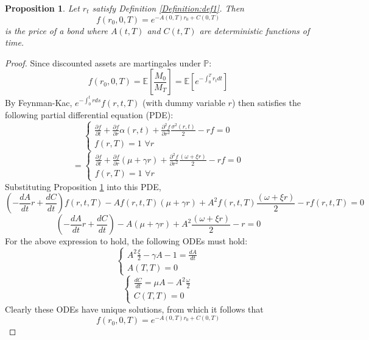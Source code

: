 \documentclass[12pt]{article}
\newtheorem{bond}{Proposition}
\theoremstyle{definition}
\theoremstyle{remark}
\begin{document}
\begin{bond}
Let \(r_t\) satisfy Definition \ref{Definition:def1}.  Then
\[f(r_0, 0, T)=e^{-A(0, T)r_0+C(0, T)}\] is the price of a bond where \(A(t, T)\) and \(C(t, T)\) are deterministic functions of time.
\label{Proposition:prop1}
\end{bond}
\begin{proof}
Since discounted assets are martingales under \(\mathbb{P}\):
\[f(r_0, 0, T)=\mathbb{E}\left[\frac{M_0}{M_T}\right]=\mathbb{E}\left[e^{-\int_0 ^T r_t dt}\right]\]  
By Feynman-Kac, \(e^{-\int _0 ^ t r ds} f(r, t, T)\) (with dummy variable \(r\)) then satisfies the following partial differential equation (PDE):
\begin{equation*}
\left\{
\begin{array}{rl}
\frac{\partial f }{\partial t}+\frac{\partial f}{\partial r} \alpha(r, t)+\frac{\partial^2 f}{\partial r^2} \frac{\sigma^2 (r, t)}{2} -rf=0 \\
f(r, T)=1\,\,\forall r
\end{array}
\right.
\end{equation*}
\begin{equation}
=\left\{
\begin{array}{rl}
\frac{\partial f }{\partial t}+\frac{\partial f}{\partial r} (\mu+\gamma r)+\frac{\partial^2 f}{\partial r^2}\frac{(\omega+\xi r)}{2} -rf=0 \\
f(r, T)=1\,\,\forall r
\end{array}
\right.
\label{Equation:eq3}
\end{equation}
Substituting Proposition \ref{Proposition:prop1} into this PDE, 
\[\left(-\frac{d A }{d t} r+\frac{d C}{d t}\right)f(r, t, T)-A f(r, t, T)(\mu+\gamma r)+A^2 f(r, t, T)\frac{(\omega+\xi r)}{2}-rf(r, t, T) =0\]
\[\left(-\frac{d A }{d t} r+\frac{d C}{d t}\right)-A (\mu+\gamma r)+A^2 \frac{(\omega+\xi r)}{2}-r=0\]
For the above expression to hold, the following ODEs must hold:
\begin{equation}
\left\{
\begin{array}{rl}
A^2 \frac{\xi}{2}-\gamma A-1 =\frac{dA}{dt} \\
A(T, T)=0
\label{Equation:eqode}
\end{array}
\right.
\end{equation}
\begin{equation}
\left\{
\begin{array}{rl}
\frac{dC}{dt} =\mu A -A^2 \frac{\omega}{2} \\
C(T, T)=0
\end{array}
\right.
\label{Equation:eq10}
\end{equation}
Clearly these ODEs have unique solutions, from which it follows that 
\[f(r_0, 0, T)=e^{-A(0, T)r_0+C(0, T)}\]
\end{proof}
\end{document}
